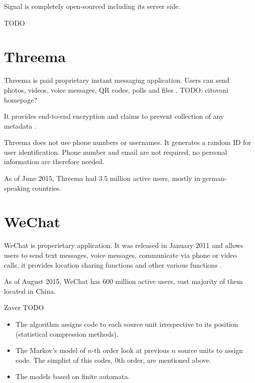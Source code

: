 \documentclass[thesis=M,english]{FITthesis}[2012/10/20]
\begin{document}
Signal is completely open-sourced including its server side.

TODO

\section{Threema}

Threema is paid proprietary instant messaging application. Users can send  photos, videos, voice messages, QR codes, polls and files \cite{threemahomepage}. TODO: citovani homepage?

It provides end-to-end encryption and claims to prevent collection of any metadata \cite{threemahomepage}.

Threema does not use phone numbers or usernames. It generates a random ID for user identification. Phone number and email are not required, no personal information are therefore needed.

As of June 2015, Threema had 3.5 million active users, mostly in german-speaking countries.\cite{threemausers}

\section{WeChat}

WeChat is properietary application. It was released in January 2011 and allows users to send text messages, voice messages, communicate via phone or video calls, it provides location sharing functions and other various functions \cite{wechatfeatures}.

As of August 2015, WeChat has 600 million active users, vast majority of them located in China.\cite{wechatusers}

\begin{conclusion}

Zaver TODO


\begin{itemize}
	\item The algorithm assigns code to each source unit irrespective to its position (statistical compression methods).
	\item The Markov's model of $n$-th order look at previous $n$ source units to assign code. The simplist of this codes, 0th order, are mentioned above.
	\item The models based on finite automata.
\end{itemize}

	

\end{conclusion}
\end{document}
